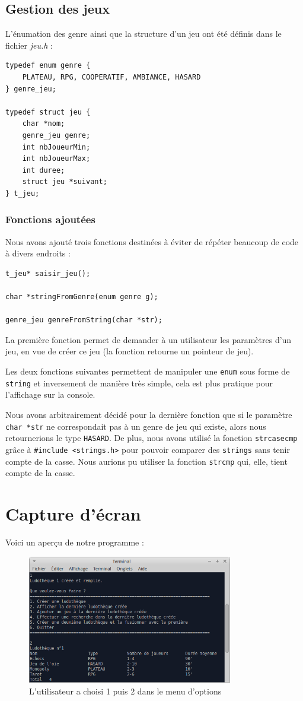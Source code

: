 \section{Gestion des jeux}
L'énumation des genre ainsi que la structure d'un jeu ont été définis dans le fichier \textit{jeu.h} :
\begin{lstlisting}
typedef enum genre {
    PLATEAU, RPG, COOPERATIF, AMBIANCE, HASARD
} genre_jeu;

typedef struct jeu {
    char *nom;
    genre_jeu genre;
    int nbJoueurMin;
    int nbJoueurMax;
    int duree;
    struct jeu *suivant;
} t_jeu;
\end{lstlisting}

\subsection{Fonctions ajoutées}
Nous avons ajouté trois fonctions destinées à éviter de répéter beaucoup de code à divers endroits :
\begin{lstlisting}
t_jeu* saisir_jeu();

char *stringFromGenre(enum genre g);

genre_jeu genreFromString(char *str);
\end{lstlisting}

La première fonction permet de demander à un utilisateur les paramètres d'un jeu, en vue de créer ce jeu (la fonction retourne un pointeur de jeu).

\medskip

Les deux fonctions suivantes permettent de manipuler une \lstinline{enum} sous forme de \lstinline{string} et inversement de manière très simple, cela est plus pratique pour l'affichage sur la console.

\medskip

Nous avons arbitrairement décidé pour la dernière fonction que si le paramètre \lstinline{char *str} ne correspondait pas à un genre de jeu qui existe, alors nous retournerions le type \lstinline{HASARD}. De plus, nous avons utilisé la fonction \lstinline{strcasecmp} grâce à \lstinline{#include <strings.h>} pour pouvoir comparer des \lstinline{strings} sans tenir compte de la casse. Nous aurions pu utiliser la fonction \lstinline{strcmp} qui, elle, tient compte de la casse.


\chapter{Capture d'écran}
Voici un aperçu de notre programme :
\begin{figure}[!h]
   \centering\includegraphics[width=0.8\textwidth]{sample.png}
   \caption{L'utilisateur a choisi 1 puis 2 dans le menu d'options}
\end{figure}